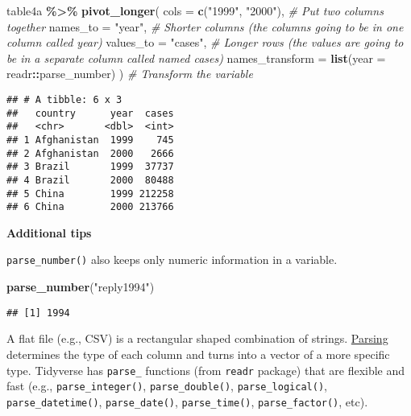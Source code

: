 \documentclass[
]{book}
\newenvironment{Shaded}{\begin{snugshade}}{\end{snugshade}}
\newcommand{\CommentTok}[1]{\textcolor[rgb]{0.56,0.35,0.01}{\textit{#1}}}
\newcommand{\DataTypeTok}[1]{\textcolor[rgb]{0.13,0.29,0.53}{#1}}
\newcommand{\KeywordTok}[1]{\textcolor[rgb]{0.13,0.29,0.53}{\textbf{#1}}}
\newcommand{\NormalTok}[1]{#1}
\newcommand{\OperatorTok}[1]{\textcolor[rgb]{0.81,0.36,0.00}{\textbf{#1}}}
\newcommand{\StringTok}[1]{\textcolor[rgb]{0.31,0.60,0.02}{#1}}
\begin{document}
\begin{Shaded}
\begin{Highlighting}[]
\NormalTok{table4a }\OperatorTok{\%\textgreater{}\%}
\StringTok{  }\KeywordTok{pivot\_longer}\NormalTok{(}
    \DataTypeTok{cols =} \KeywordTok{c}\NormalTok{(}\StringTok{"1999"}\NormalTok{, }\StringTok{"2000"}\NormalTok{), }\CommentTok{\# Put two columns together}
    \DataTypeTok{names\_to =} \StringTok{"year"}\NormalTok{, }\CommentTok{\# Shorter columns (the columns going to be in one column called year)}
    \DataTypeTok{values\_to =} \StringTok{"cases"}\NormalTok{, }\CommentTok{\# Longer rows (the values are going to be in a separate column called named cases)}
    \DataTypeTok{names\_transform =} \KeywordTok{list}\NormalTok{(}\DataTypeTok{year =}\NormalTok{ readr}\OperatorTok{::}\NormalTok{parse\_number)}
\NormalTok{  ) }\CommentTok{\# Transform the variable}
\end{Highlighting}
\end{Shaded}

\begin{verbatim}
## # A tibble: 6 x 3
##   country      year  cases
##   <chr>       <dbl>  <int>
## 1 Afghanistan  1999    745
## 2 Afghanistan  2000   2666
## 3 Brazil       1999  37737
## 4 Brazil       2000  80488
## 5 China        1999 212258
## 6 China        2000 213766
\end{verbatim}

\textbf{Additional tips}

\texttt{parse\_number()} also keeps only numeric information in a variable.

\begin{Shaded}
\begin{Highlighting}[]
\KeywordTok{parse\_number}\NormalTok{(}\StringTok{"reply1994"}\NormalTok{)}
\end{Highlighting}
\end{Shaded}

\begin{verbatim}
## [1] 1994
\end{verbatim}

A flat file (e.g., CSV) is a rectangular shaped combination of strings. \href{https://cran.r-project.org/web/packages/readr/vignettes/readr.html}{Parsing} determines the type of each column and turns into a vector of a more specific type. Tidyverse has \texttt{parse\_} functions (from \texttt{readr} package) that are flexible and fast (e.g., \texttt{parse\_integer()}, \texttt{parse\_double()}, \texttt{parse\_logical()}, \texttt{parse\_datetime()}, \texttt{parse\_date()}, \texttt{parse\_time()}, \texttt{parse\_factor()}, etc).
\end{document}
